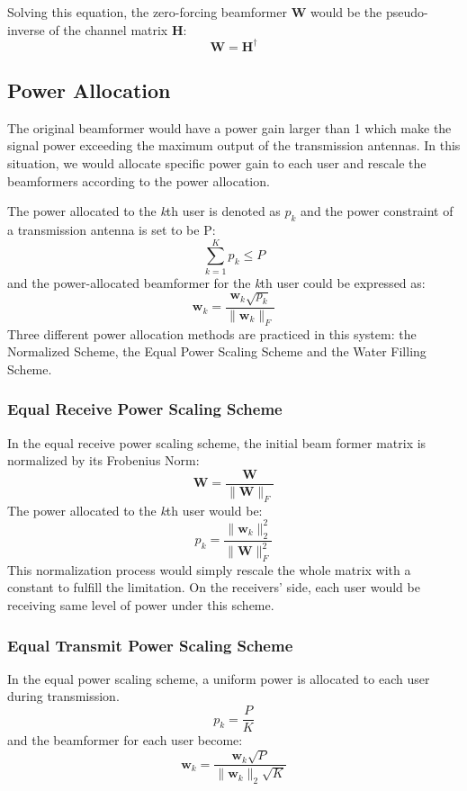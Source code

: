 \documentclass{article}
\begin{document}
\noindent
Solving this equation, the zero-forcing beamformer \textbf{W} would be the pseudo-inverse of the channel matrix \textbf{H}:
\[
\textbf{W} = \textbf{H}^{\dagger}
\]

\subsection{Power Allocation}
The original beamformer would have a power gain larger than 1 which make the signal power exceeding the maximum output of the transmission antennas.
In this situation, we would allocate specific power gain to each user and rescale the beamformers according to the power allocation.

\noindent
The power allocated to the \textit{k}th user is denoted as $p_k$ and the power constraint of a transmission antenna is set to be P:
\[\sum_{k=1}^K p_k \leq P\]
and the power-allocated beamformer for the \textit{k}th user could be expressed as:
\[\textbf{w}_k = \frac{\textbf{w}_k\sqrt{p_k}}{\lVert \textbf{w}_k \rVert_{F}}\]
Three different power allocation methods are practiced in this system:
the Normalized Scheme, the Equal Power Scaling Scheme and the Water Filling Scheme.
\subsubsection{Equal Receive Power Scaling Scheme}
In the equal receive power scaling scheme, the initial beam former matrix is normalized by its Frobenius Norm:
\[
\textbf{W} = \frac{\textbf{W}}{\lVert \textbf{W} \rVert_{F}}
\]
The power allocated to the \textit{k}th user would be:
\[p_k = \frac{\lVert \textbf{w}_k \rVert_{2}^2}{\lVert \textbf{W} \rVert_{F}^2}\]
This normalization process would simply rescale the whole matrix with a constant to fulfill the limitation.
On the receivers' side, each user would be receiving same level of power under this scheme.

\subsubsection{Equal Transmit Power Scaling Scheme}
In the equal power scaling scheme, a uniform power is allocated to each user during transmission.
\[p_k = \frac{P}{K}\]
and the beamformer for each user become:
\[\textbf{w}_k = \frac{\textbf{w}_k\sqrt{P}}{\lVert \textbf{w}_k \rVert_{2}\sqrt{K}}\]
\end{document}
